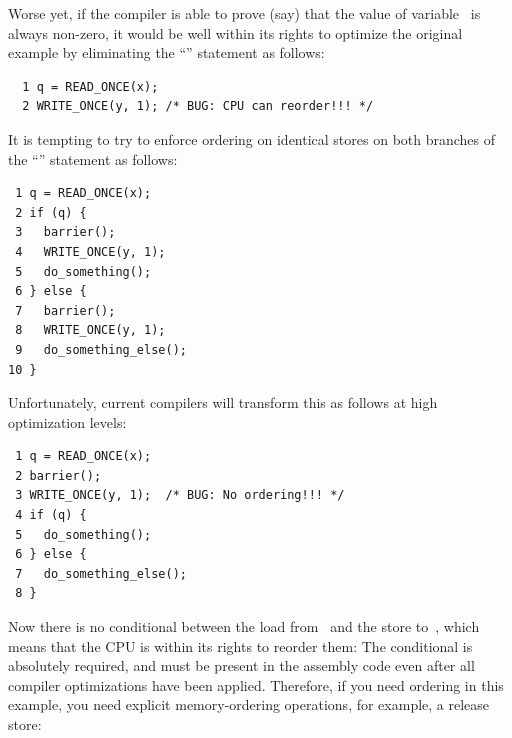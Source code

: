 Worse yet, if the compiler is able to prove (say) that the value of
variable~ is always non-zero, it would be well within its rights
to optimize the original example by eliminating the ``'' statement
as follows:

\vspace{5pt}
\begin{minipage}[t]{\columnwidth}
\scriptsize
\begin{verbatim}
  1 q = READ_ONCE(x);
  2 WRITE_ONCE(y, 1); /* BUG: CPU can reorder!!! */
\end{verbatim}
\end{minipage}
\vspace{5pt}

It is tempting to try to enforce ordering on identical stores on both
branches of the ``'' statement as follows:

\vspace{5pt}
\begin{minipage}[t]{\columnwidth}
\scriptsize
\begin{verbatim}
 1 q = READ_ONCE(x);
 2 if (q) {
 3   barrier();
 4   WRITE_ONCE(y, 1);
 5   do_something();
 6 } else {
 7   barrier();
 8   WRITE_ONCE(y, 1);
 9   do_something_else();
10 }
\end{verbatim}
\end{minipage}
\vspace{5pt}

Unfortunately, current compilers will transform this as follows at high
optimization levels:

\vspace{5pt}
\begin{minipage}[t]{\columnwidth}
\scriptsize
\begin{verbatim}
 1 q = READ_ONCE(x);
 2 barrier();
 3 WRITE_ONCE(y, 1);  /* BUG: No ordering!!! */
 4 if (q) {
 5   do_something();
 6 } else {
 7   do_something_else();
 8 }
\end{verbatim}
\end{minipage}
\vspace{5pt}

Now there is no conditional between the load from~ and the store
to~, which means that the CPU is within its rights to reorder them:
The conditional is absolutely required, and must be present in the
assembly code even after all compiler optimizations have been applied.
Therefore, if you need ordering in this example, you need explicit
memory-ordering operations, for example, a release store:

